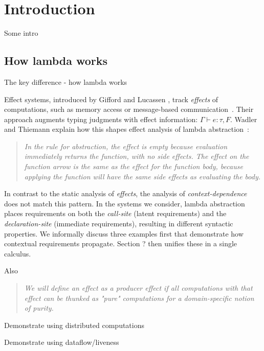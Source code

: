 \chapter{Introduction} 
\label{ch:introduction} 


Some intro

\section{How lambda works}
The key difference - how lambda works

Effect systems, introduced by Gifford and Lucassen
\cite{effects-gifford}, track \emph{effects} of computations, such as
memory access or message-based
communication~\cite{effects-messagepassing}. Their approach augments
typing judgments with effect information: $\Gamma \vdash e :
\tau, F$.  Wadler and Thiemann explain how this shapes
effect analysis of lambda abstraction~\cite{monads-effects-marriage}:
%
\begin{quote}
\emph{In the rule for abstraction, the effect is empty because evaluation immediately
returns the function, with no side effects. The effect on the function arrow
is the same as the effect for the function body, because applying the function will
have the same side effects as evaluating the body.}
\end{quote}
%
In contrast to the static analysis of \emph{effects}, the analysis of \emph{context-dependence} 
does not match this pattern. In the systems we consider, lambda abstraction places 
requirements on both the \emph{call-site} (latent requirements) and the \emph{declaration-site} 
(immediate requirements), resulting in different syntactic properties. 
We informally discuss three examples first that demonstrate how contextual
requirements propagate. Section ? then unifies these 
in a single calculus.

Also \cite{effects-producer-semantics}

\begin{quote}
\emph{We will define an effect as a producer effect if all computations with that effect 
can be thunked as "pure" computations for a domain-specific notion of purity.}
\end{quote}


Demonstrate using distributed computations

Demonstrate using dataflow/liveness

